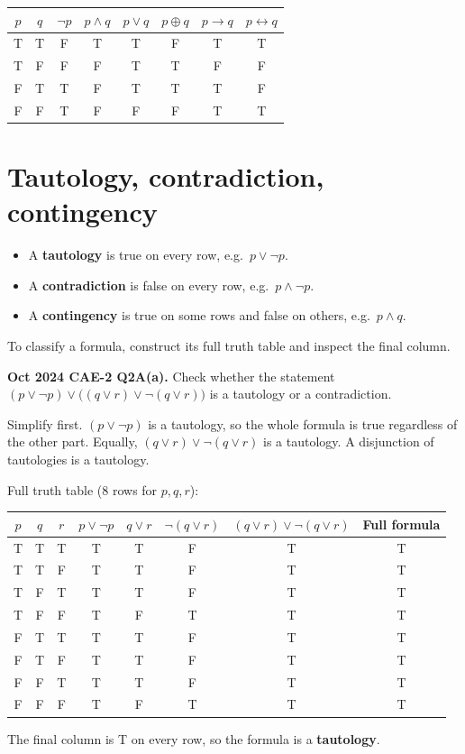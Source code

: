 \documentclass[11pt,a4paper]{article}
\begin{document}
\begin{center}\small
\begin{tabular}{cc|cccccc}
\toprule $p$&$q$&$\neg p$&$p\land q$&$p\lor q$&$p\oplus q$&$p\to q$&$p\leftrightarrow q$\\\midrule
T&T&F&T&T&F&T&T\\
T&F&F&F&T&T&F&F\\
F&T&T&F&T&T&T&F\\
F&F&T&F&F&F&T&T\\\bottomrule
\end{tabular}
\end{center}

\section{Tautology, contradiction, contingency}

\begin{itemize}
\item A \textbf{tautology} is true on every row, e.g.\ $p\lor\neg p$.
\item A \textbf{contradiction} is false on every row, e.g.\ $p\land\neg p$.
\item A \textbf{contingency} is true on some rows and false on others, e.g.\ $p\land q$.
\end{itemize}
To classify a formula, construct its full truth table and inspect the final column.

\begin{pyqbox}
\textbf{Oct 2024 CAE-2 Q2A(a).} Check whether the statement $(p\lor\neg p)\lor\bigl((q\lor r)\lor\neg(q\lor r)\bigr)$ is a tautology or a contradiction.
\end{pyqbox}

\begin{solbox}
Simplify first. $(p\lor\neg p)$ is a tautology, so the whole formula is true regardless of the other part. Equally, $(q\lor r)\lor\neg(q\lor r)$ is a tautology. A disjunction of tautologies is a tautology.

Full truth table (8 rows for $p,q,r$):
\begin{center}\small
\begin{tabular}{ccc|ccccc}
\toprule $p$&$q$&$r$&$p\lor\neg p$&$q\lor r$&$\neg(q\lor r)$&$(q\lor r)\lor\neg(q\lor r)$&Full formula\\\midrule
T&T&T&T&T&F&T&T\\
T&T&F&T&T&F&T&T\\
T&F&T&T&T&F&T&T\\
T&F&F&T&F&T&T&T\\
F&T&T&T&T&F&T&T\\
F&T&F&T&T&F&T&T\\
F&F&T&T&T&F&T&T\\
F&F&F&T&F&T&T&T\\\bottomrule
\end{tabular}
\end{center}
The final column is T on every row, so the formula is a \textbf{tautology}.
\end{solbox}
\end{document}
